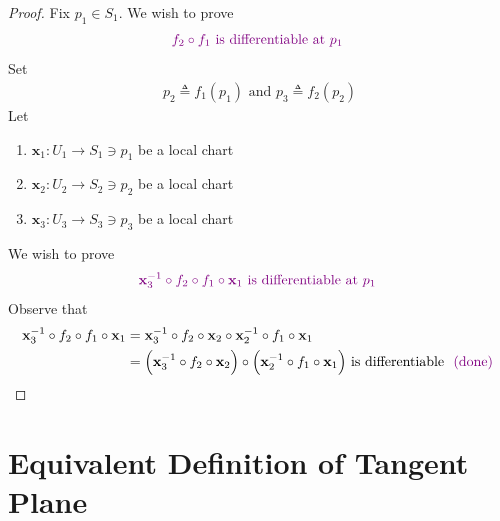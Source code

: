 \documentclass{report}
\begin{document}
\begin{proof}
Fix $p_1\in S_1 $. We wish to prove 
\begin{align*}
  \textcolor{violet}{f_2\circ f_1\text{ is differentiable at $p_1$ }}
\end{align*}
Set 
\begin{align*}
p_2\triangleq f_1(p_1)\text{ and }p_3\triangleq f_2(p_2)
\end{align*}
Let 
\begin{enumerate}[label=(\alph*)]
  \item $\textbf{x}_1:U_1 \rightarrow S_1 \ni p_1 $ be a local chart 
   \item $\textbf{x}_2:U_2\rightarrow S_2\ni p_2$ be a local chart
    \item $\textbf{x}_3:U_3\rightarrow  S_3\ni p_3$ be a local chart
\end{enumerate}
We wish to prove 
\begin{align*}
  \textcolor{violet}{\textbf{x}_3^{-1}\circ f_2\circ f_1 \circ \textbf{x}_1\text{ is differentiable at $p_1$ }}
\end{align*}
Observe that 
\begin{align*}
\textbf{x}_3^{-1}\circ f_2\circ f_1\circ \textbf{x}_1&=\textbf{x}_3^{-1}\circ f_2 \circ \textbf{x}_2 \circ \textbf{x}_2^{-1} \circ f_1 \circ \textbf{x}_1\\
&=\Big(\textbf{x}_3^{-1}\circ f_2\circ \textbf{x}_2 \Big)\circ \Big(\textbf{x}_2^{-1}\circ f_1\circ \textbf{x}_1 \Big)\text{ is differentiable $\textcolor{violet}{\text{ (done) }}$}
\end{align*}
\end{proof}

\section{Equivalent Definition of Tangent Plane}
\end{document}
